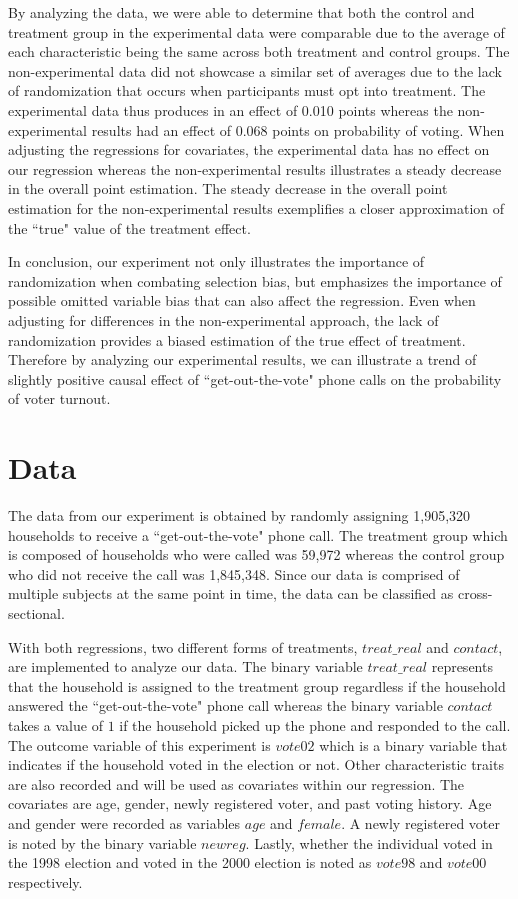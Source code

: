 \documentclass[12pt]{article}
\begin{document}
\indent By analyzing the data, we were able to determine that both the control and treatment group in the experimental data were comparable due to the average of each characteristic being the same across both treatment and control groups. The non-experimental data did not showcase a similar set of averages due to the lack of randomization that occurs when participants must opt into treatment. The experimental data thus produces in an effect of 0.010 points whereas the non-experimental results had an effect of 0.068 points on probability of voting. When adjusting the regressions for covariates, the experimental data has no effect on our regression whereas the non-experimental results illustrates a steady decrease in the overall point estimation. The steady decrease in the overall point estimation for the non-experimental results exemplifies a closer approximation of the ``true" value of the treatment effect.  

\indent In conclusion, our experiment not only illustrates the importance of randomization when combating selection bias, but emphasizes the importance of possible omitted variable bias that can also affect the regression. Even when adjusting for differences in the non-experimental approach, the lack of randomization provides a biased estimation of the true effect of treatment. Therefore by analyzing our experimental results, we can illustrate a trend of slightly positive causal effect of ``get-out-the-vote" phone calls on the probability of voter turnout.

\section{Data}
The data from our experiment is obtained by randomly assigning 1,905,320 households to receive a ``get-out-the-vote" phone call. The treatment group which is composed of households who were called was 59,972 whereas the control group who did not receive the call was 1,845,348. Since our data is comprised of multiple subjects at the same point in time, the data can be classified as cross-sectional.

\indent With both regressions, two different forms of treatments, $treat\_real$ and $contact$, are implemented to analyze our data. The binary variable $treat\_real$ represents that the household is assigned to the treatment group regardless if the household answered the ``get-out-the-vote" phone call whereas the binary variable $contact$ takes a value of $1$ if the household picked up the phone and responded to the call. The outcome variable of this experiment is $vote02$ which is a binary variable that indicates if the household voted in the election or not. Other characteristic traits are also recorded and will be used as covariates within our regression. The covariates are age, gender, newly registered voter, and past voting history. Age and gender were recorded as variables $age$ and $female$. A newly registered voter is noted by the binary variable $newreg$. Lastly, whether the individual voted in the 1998 election and voted in the 2000 election is noted as $vote98$ and $vote00$ respectively.
\end{document}
